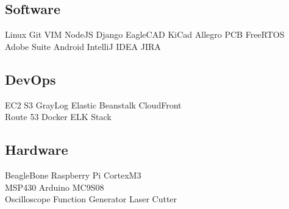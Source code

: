 \documentclass[]{deedy-resume-openfont}
\begin{document}
\begin{minipage}[t]{0.25\textwidth}
\subsection{Software}
Linux \textbullet{} Git \textbullet{} VIM \textbullet{} NodeJS %
Django \textbullet{} EagleCAD \textbullet{} KiCad
Allegro PCB \textbullet{} FreeRTOS \\ %
Adobe Suite \textbullet{} Android \textbullet{} IntelliJ IDEA \textbullet{} JIRA
\sectionsep

\subsection{DevOps}
EC2 \textbullet{} S3 \textbullet{} GrayLog \textbullet{} Elastic Beanstalk 
\textbullet{} CloudFront \\ %
Route 53 \textbullet{} Docker \textbullet{} ELK Stack
\sectionsep

\subsection{Hardware}
BeagleBone \textbullet{} Raspberry Pi \textbullet{} CortexM3 \\
MSP430\textbullet{} Arduino \textbullet{} MC9S08 \\
Oscilloscope \textbullet{} Function Generator \textbullet{} Laser Cutter
\sectionsep





\end{minipage}
\end{document}
